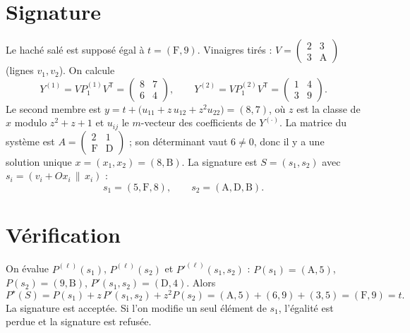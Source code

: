 \section*{Signature}
Le haché salé est supposé égal à $t=(\mathrm{F},9)$. Vinaigres tirés : $V=\begin{pmatrix}2&3\\3&\mathrm{A}\end{pmatrix}$ (lignes $v_1,v_2$). On calcule
\[Y^{(1)}=VP^{(1)}_1V^{\mathsf T}=\begin{pmatrix}8&7\\6&4\end{pmatrix},\qquad Y^{(2)}=VP^{(2)}_1V^{\mathsf T}=\begin{pmatrix}1&4\\3&9\end{pmatrix}.\]
Le second membre est $y=t+\bigl(u_{11}+z\,u_{12}+z^2u_{22}\bigr)=(8,7)$, où $z$ est la classe de $x$ modulo $z^2+z+1$ et $u_{ij}$ le $m$-vecteur des coefficients de $Y^{(\cdot)}$. La matrice du système est $A=\begin{pmatrix}2&1\\\mathrm{F}&\mathrm{D}\end{pmatrix}$ ; son déterminant vaut $6\neq0$, donc il y a une solution unique $x=(x_1,x_2)=(8,\mathrm{B})$. La signature est $S=(s_1,s_2)$ avec $s_i=(v_i+Ox_i\,\|\,x_i)$ :
\[s_1=(5,\mathrm{F},8),\qquad s_2=(\mathrm{A},\mathrm{D},\mathrm{B}).\]

\section*{Vérification}
On évalue $P^{(\ell)}(s_1)$, $P^{(\ell)}(s_2)$ et $P'^{(\ell)}(s_1,s_2)$ :
$P(s_1)=(\mathrm{A},5)$, $P(s_2)=(9,\mathrm{B})$, $P'(s_1,s_2)=(\mathrm{D},4)$. Alors
\[P^\star(S)=P(s_1)+z\,P'(s_1,s_2)+z^2P(s_2)=(\mathrm{A},5)+(6,9)+(3,5)=(\mathrm{F},9)=t.\]
La signature est acceptée. Si l'on modifie un seul élément de $s_1$, l'égalité est perdue et la signature est refusée.
